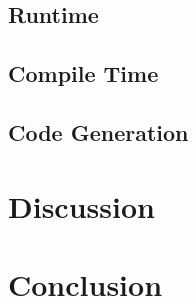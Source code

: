 \documentclass[conference]{IEEEtran}
\begin{document}
\subsection{Runtime}
\subsection{Compile Time}
\subsection{Code Generation}
\section{Discussion}
\section{Conclusion}



\printbibliography
\end{document}
